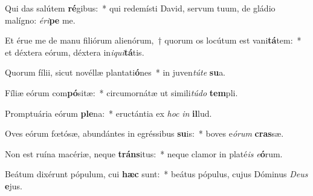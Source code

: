 \item Qui das salútem \textbf{ré}gibus:~* qui redemísti David, servum tuum, de gládio malígno: \textit{é}\textit{ri}\textbf{pe} me.
\item Et érue me de manu filiórum alienórum,~† quorum os locútum est vani\textbf{tá}tem:~* et déxtera eórum, déxtera in\textit{i}\textit{qui}\textbf{tá}tis.
\item Quorum fílii, sicut novéllæ plantati\textbf{ó}nes~* in juven\textit{tú}\textit{te} \textbf{su}a.
\item Fíliæ eórum com\textbf{pó}sitæ:~* circumornátæ ut simili\textit{tú}\textit{do} \textbf{tem}pli.
\item Promptuária eórum \textbf{ple}na:~* eructántia ex \textit{hoc} \textit{in} \textbf{il}lud.
\item Oves eórum fœtósæ, abundántes in egréssibus \textbf{su}is:~* boves e\textit{ó}\textit{rum} \textbf{cras}sæ.
\item Non est ruína macériæ, neque \textbf{tráns}itus:~* neque clamor in platé\textit{is} \textit{e}\textbf{ó}rum.
\item Beátum dixérunt pópulum, cui \textbf{hæc} sunt:~* beátus pópulus, cujus Dóminus \textit{De}\textit{us} \textbf{e}jus.
